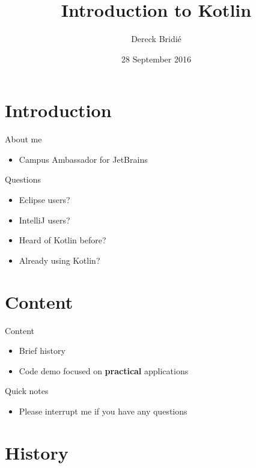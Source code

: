 \documentclass{beamer}
\title{Introduction to Kotlin}
\author{Dereck Bridi\'e}
\date{28 September 2016}
\begin{document}
\begin{frame}
\maketitle
\end{frame}

\section{Introduction}

\begin{frame}{About me}
\begin{itemize}
    \item Campus Ambassador for JetBrains
\end{itemize}
\end{frame}

\begin{frame}{Questions}
\begin{itemize}
    \item Eclipse users?
    \item IntelliJ users?  \bigskip   \pause
    \item Heard of Kotlin before?
    \item Already using Kotlin?
\end{itemize}
\end{frame}

\section{Content}
\begin{frame}{Content}
\begin{itemize}
    \item Brief history
    \item Code demo focused on \textbf{practical} applications
\end{itemize}
\end{frame}

\begin{frame}{Quick notes}
\begin{itemize}
    \item Please interrupt me if you have any questions
\end{itemize}
\end{frame}

\section{History}
\end{document}
